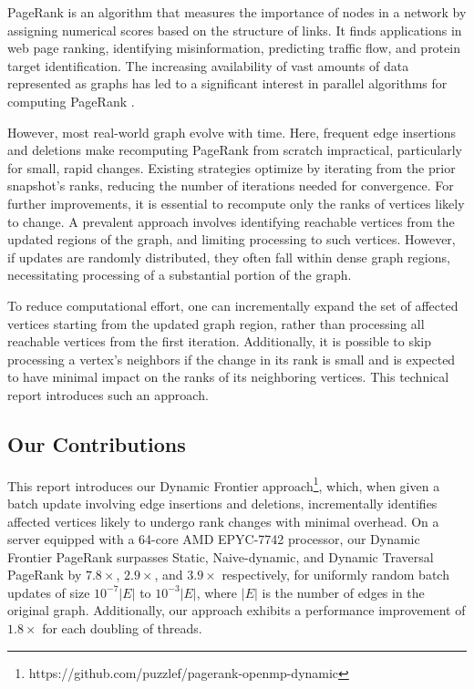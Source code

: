 PageRank \cite{rank-page99} is an algorithm that measures the importance of nodes in a network by assigning numerical scores based on the structure of links. It finds applications in web page ranking, identifying misinformation, predicting traffic flow, and protein target identification. The increasing availability of vast amounts of data represented as graphs has led to a significant interest in parallel algorithms for computing PageRank \cite{rank-garg16, rank-nvgraph, rank-giri20, rank-sarma13}.

However, most real-world graph evolve with time. Here, frequent edge insertions and deletions make recomputing PageRank from scratch impractical, particularly for small, rapid changes. Existing strategies optimize by iterating from the prior snapshot's ranks, reducing the number of iterations needed for convergence. For further improvements, it is essential to recompute only the ranks of vertices likely to change. A prevalent approach involves identifying reachable vertices from the updated regions of the graph, and limiting processing to such vertices. However, if updates are randomly distributed, they often fall within dense graph regions, necessitating processing of a substantial portion of the graph.

To reduce computational effort, one can incrementally expand the set of affected vertices starting from the updated graph region, rather than processing all reachable vertices from the first iteration. Additionally, it is possible to skip processing a vertex's neighbors if the change in its rank is small and is expected to have minimal impact on the ranks of its neighboring vertices. This technical report introduces such an approach.




\subsection{Our Contributions}

This report introduces our Dynamic Frontier approach\footnote{https://github.com/puzzlef/pagerank-openmp-dynamic}, which, when given a batch update involving edge insertions and deletions, incrementally identifies affected vertices likely to undergo rank changes with minimal overhead. On a server equipped with a 64-core AMD EPYC-7742 processor, our Dynamic Frontier PageRank surpasses Static, Naive-dynamic, and Dynamic Traversal PageRank by $7.8\times$, $2.9\times$, and $3.9\times$ respectively, for uniformly random batch updates of size $10^{-7}|E|$ to $10^{-3}|E|$, where $|E|$ is the number of edges in the original graph. Additionally, our approach exhibits a performance improvement of $1.8\times$ for each doubling of threads.




